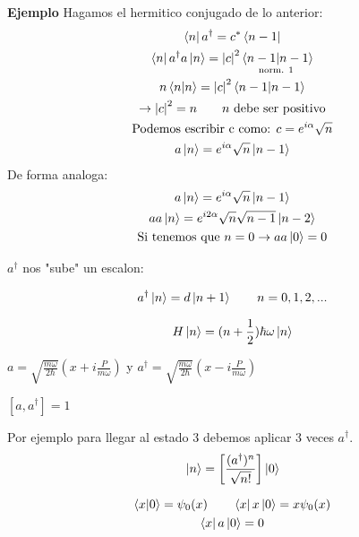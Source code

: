 \documentclass{article}
\newcommand{\caja}[3]{%
  \begin{tcolorbox}[colback=#1!5!white,colframe=#1!25!black,title=#2]
    #3
  \end{tcolorbox}%
}
\begin{document}
\textbf{Ejemplo }
Hagamos el hermitico conjugado de lo anterior: 
\begin{gather*}
  \bra{n } a ^ {\dag } = c ^ {* } \bra{n-1}\\
  \bra{n }a ^ {\dag }a \ket{n} = \left|c \right| ^ {2 } \underset{\text{norm. 1 }}{\bra{n-1 }\ket{n-1 }  }\\
  n \bra{n }\ket{n } = \left|c \right|^ {2 } \bra{n-1 }\ket{n-1 }  \\
  \rightarrow \left|c \right|^ {2 } = n \qquad n \text{ debe ser positivo}\\
  \text{Podemos escribir c como: } c = e ^ {i \alpha }\sqrt{n } \\
  a \ket{n } = e ^ {i \alpha} \sqrt{n } \ket{n-1 } 
\end{gather*}
De forma analoga: 
\begin{gather*}
  a \ket{n } = e ^ {i \alpha } \sqrt{n }  \ket{n-1 }\\
  aa \ket{n } = e ^ {i2\alpha} \sqrt{n } \sqrt{n-1 } \ket{n-2 } \\
  \text{Si tenemos que }n=0 \rightarrow aa \ket{0 } = 0
\end{gather*}

$ a ^ {\dag } $ nos "sube" un escalon: 
\caja{red}{}{
  \begin{gather*}
    a ^ {\dag } \ket{n } = d \ket{n+1 } \qquad n = 0,1,2,... 
  \end{gather*}
}

\begin{gather*}
  H \ket{n } = (n + \frac{1}{2}) \hbar \omega \ket{n } 
\end{gather*}

\caja{red}{Operador de aniquilacion y creacion }{
  $ a = \sqrt{\frac{m \omega}{2 \hbar }} (x + i \frac{P }{m\omega} ) $ y $ a ^ {\dag } = \sqrt{\frac{m \omega}{2 \hbar }} \left(x - i\frac{P }{m\omega}\right) $

  $ [a,a ^ {\dag }] = 1  $

  Por ejemplo para llegar al estado 3 debemos aplicar 3 veces $ a ^ {\dag } $.
  \begin{gather*}
    \ket{n } = \left[\frac{(a ^ {\dag })^ {n }}{\sqrt{n! } }\right]\ket{0}
  \end{gather*}
}

\begin{gather*}
  \bra{x}\ket{0 } = \psi_0(x) \qquad \bra{x }x \ket{0 } = x \psi_0(x)\\
  \bra{x }a \ket{0 } = 0  
\end{gather*}
\end{document}
